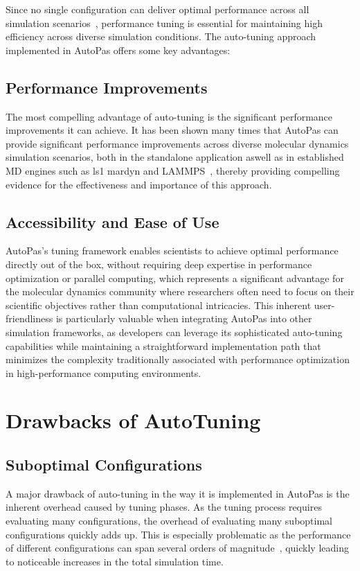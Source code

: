 \documentclass[conference]{IEEEtran}
\begin{document}
Since no single configuration can deliver optimal performance across all simulation scenarios~\cite{Tchipev2020}, performance tuning is essential for maintaining high efficiency across diverse simulation conditions. The auto-tuning approach implemented in AutoPas offers some key advantages:

\subsection*{Performance Improvements}

The most compelling advantage of auto-tuning is the significant performance improvements it can achieve. It has been shown many times that AutoPas can provide significant performance improvements across diverse molecular dynamics simulation scenarios, both in the standalone application aswell as in established MD engines such as ls1 mardyn and LAMMPS~\cite{SECKLER2021101296}\cite{Gratl2022AutoPas}, thereby providing compelling evidence for the effectiveness and importance of this approach.

\subsection*{Accessibility and Ease of Use}
AutoPas's tuning framework enables scientists to achieve optimal performance directly out of the box, without requiring deep expertise in performance optimization or parallel computing, which represents a significant advantage for the molecular dynamics community where researchers often need to focus on their scientific objectives rather than computational intricacies. This inherent user-friendliness is particularly valuable when integrating AutoPas into other simulation frameworks, as developers can leverage its sophisticated auto-tuning capabilities while maintaining a straightforward implementation path that minimizes the complexity traditionally associated with performance optimization in high-performance computing environments.

\section{Drawbacks of AutoTuning}

\subsection*{Suboptimal Configurations}

A major drawback of auto-tuning in the way it is implemented in AutoPas is the inherent overhead caused by tuning phases. As the tuning process requires evaluating many configurations, the overhead of evaluating many suboptimal configurations quickly adds up. This is especially problematic as the performance of different configurations can span several orders of magnitude~\cite{endreport.pdf}\cite{Manuel_Lerchner_Thesis.pdf}, quickly leading to noticeable increases in the total simulation time.
\end{document}
